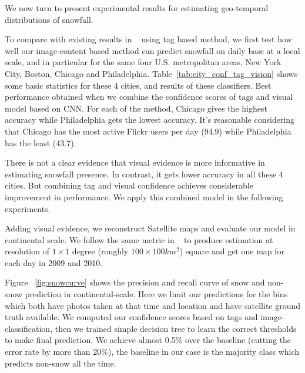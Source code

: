 We now turn to present experimental results for estimating geo-temporal distributions of snowfall.

To compare with existing results in ~\cite{wang2013observing} using tag based method,
we first test how well our image-content based method can predict snowfall on daily base at a local scale, 
and in particular 
for the same four U.S. metropolitan areas, New York City, Boston, Chicago and Philadelphia. 
Table~\ref{tab:city_conf_tag_vision} 
shows some basic statistics for these 4 cities, and results of these classifiers. 
Best performance obtained when we combine 
the confidence scores of tags and visual model based on CNN. For each of the method, 
Chicago gives the highest accuracy while Philadelphia gets the lowest accuracy. 
It's reasonable considering that Chicago has the most active Flickr users per
day (94.9) while Philadelphia has the least (43.7). 

There is not a clear evidence that visual evidence is more informative in estimating snowfall 
presence. In contrast, it gets lower accuracy in all these 4 cities. But combining tag and visual 
confidence achieves considerable improvement in performance. We apply this combined model 
in the following experiments.

Adding visual evidence, we reconstruct Satellite maps and 
evaluate our model in continental scale. We follow the same metric in ~\cite{ecology2012www} to produce 
estimation at resolution of $1 \times 1$ degree (roughly $100 \times 100 km^2$) square and get one map for 
each day in 2009 and 2010.

Figure ~\ref{fig:snowcurve} shows the precision and recall curve of snow and non-snow prediction in 
continental-scale.
Here we limit our predictions for the bins which both have photos taken at that 
time and location and have satellite ground truth available.
We computed our confidence scores based on tags and image-classification, then we trained 
simple decision tree to learn the correct thresholds to make final prediction. We achieve 
almost 0.5\% over the baseline (cutting the error rate by more than 20\%), the baseline in 
our case is the majority class which predicts non-snow all the time. 




